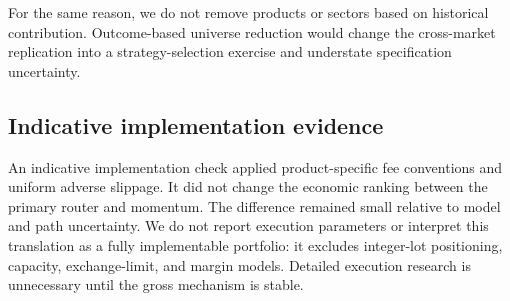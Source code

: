 For the same reason, we do not remove products or sectors based on historical
contribution. Outcome-based universe reduction would change the cross-market replication
into a strategy-selection exercise and understate specification uncertainty.

\subsection{Indicative implementation evidence}

An indicative implementation check applied product-specific fee conventions and uniform
adverse slippage. It did not change the economic ranking between the primary router and
momentum. The difference remained small relative to model and path uncertainty. We do
not report execution parameters or interpret this translation as a fully implementable
portfolio: it excludes integer-lot positioning, capacity, exchange-limit, and margin
models. Detailed execution research is unnecessary until the gross mechanism is stable.
